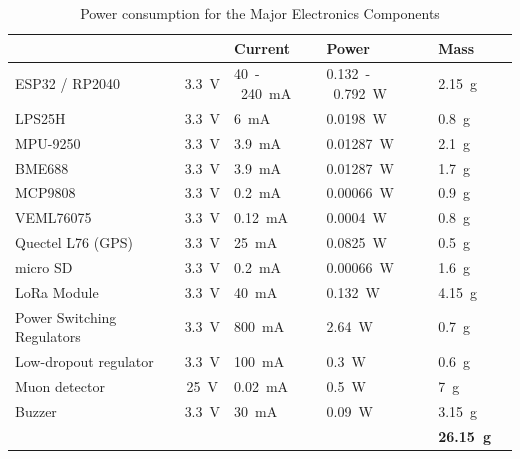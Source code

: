 \begin{table}[htbp]
\centering
{}
\begin{tabular}{>{\raggedright\arraybackslash}p{5cm}c>{\raggedleft\arraybackslash}p{2cm}
>{\raggedleft\arraybackslash}p{3cm}>{\centering\arraybackslash}p{2cm}>{\centering\arraybackslash}p{2cm}}
\hline
\rowcolor{DeepSkyBlue4}
\textbf{\color{white!50}{Component}} & \textbf{\color{white!50}{Voltage}} & \textbf{\color{white!50}\textbf{Current}} & \textbf{\color{white!50}\textbf{Power}} & \textbf{\color{white!50}\textbf{Mass}} \\ \hline
\rowcolors{2}{red}{}
ESP32 / RP2040 & \SI{3.3}{\volt} & \SI{40}-\SI{240}{\milli\ampere} & \SI{0.132}-\SI{0.792}{\watt} & \SI{2.15}{\gram}  \\
\rowcolor{LightCyan1!50}LPS25H & \SI{3.3}{\volt} & \SI{6}{\milli\ampere} & \SI{0.0198}{\watt} & \SI{0.8}{\gram}  \\
MPU-9250 & \SI{3.3}{\volt} & \SI{3.9}{\milli\ampere} &  \SI{0.01287}{\watt} &\SI{2.1}{\gram} \\
\rowcolor{LightCyan1!50}BME688 & \SI{3.3}{\volt} & \SI{3.9}{\milli\ampere} & \SI{0.01287}{\watt} & \SI{1.7}{\gram}  \\
MCP9808 & \SI{3.3}{\volt} & \SI{0.2}{\milli\ampere} &  \SI{0.00066}{\watt} &\SI{0.9}{\gram} \\
\rowcolor{LightCyan1!50}VEML76075 & \SI{3.3}{\volt} & \SI{0.12}{\milli\ampere} &  \SI{0.0004}{\watt} &\SI{0.8}{\gram}  \\
Quectel L76 (GPS) & \SI{3.3}{\volt} &  \SI{25}{\milli\ampere} &  \SI{0.0825}{\watt} & \SI{0.5}{\gram} \\
\rowcolor{LightCyan1!50}micro SD & \SI{3.3}{\volt} & \SI{0.2}{\milli\ampere} &  \SI{0.00066}{\watt} &\SI{1.6}{\gram} \\
LoRa Module & \SI{3.3}{\volt} & \SI{40}{\milli\ampere} &  \SI{0.132}{\watt} &\SI{4.15}{\gram} \\
\rowcolor{LightCyan1!50}Power Switching Regulators & \SI{3.3}{\volt} &\SI{800}{\milli\ampere}&  \SI{2.64}{\watt} &\SI{0.7}{\gram}\\
Low-dropout regulator & \SI{3.3}{\volt} &\SI{100}{\milli\ampere}&  \SI{0.3}{\watt} &\SI{0.6}{\gram}  \\
\rowcolor{LightCyan1!50}Muon detector & \SI{25}{\volt} & \SI{0.02}{\milli\ampere} & \SI{0.5}{\watt} &\SI{7}{\gram} \\ 
Buzzer & \SI{3.3}{\volt} &\SI{30}{\milli\ampere}&  \SI{0.09}{\watt} &\SI{3.15}{\gram}  \\
\rowcolor{DeepSkyBlue4}
\textbf{\color{white!50}{Total Power}} & & & \textbf{\color{white!50}{\SI{4.63}{\watt}}} & \textbf{\color{white!50}\SI{26.15}{\gram}}  \\
\hline
\end{tabular}
\caption{\small{Power consumption for the Major Electronics Components}}
\end{table}


